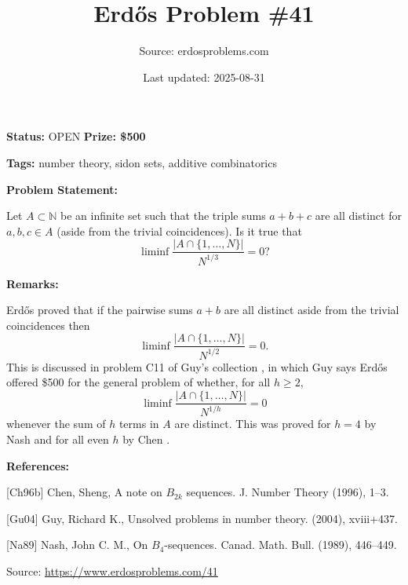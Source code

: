 \documentclass{article}
\title{Erd\H{o}s Problem \#41}
\date{Last updated: 2025-08-31}
\author{Source: erdosproblems.com}
\begin{document}
\maketitle

\noindent\textbf{Status:} OPEN \quad \textbf{Prize: \$500}

\noindent\textbf{Tags:} number theory, sidon sets, additive combinatorics

\medskip
\noindent\textbf{Problem Statement:}

Let $A\subset\mathbb{N}$ be an infinite set such that the triple sums $a+b+c$ are all distinct for $a,b,c\in A$ (aside from the trivial coincidences). Is it true that\[\liminf \frac{\lvert A\cap \{1,\ldots,N\}\rvert}{N^{1/3}}=0?\]

\bigskip
\noindent\textbf{Remarks:}

Erd\H{o}s proved that if the pairwise sums $a+b$ are all distinct aside from the trivial coincidences then\[\liminf \frac{\lvert A\cap \{1,\ldots,N\}\rvert}{N^{1/2}}=0.\]This is discussed in problem C11 of Guy's collection \cite{Gu04}, in which Guy says Erd\H{o}s offered \$500 for the general problem of whether, for all $h\geq 2$,\[\liminf \frac{\lvert A\cap \{1,\ldots,N\}\rvert}{N^{1/h}}=0\]whenever the sum of $h$ terms in $A$ are distinct. This was proved for $h=4$ by Nash \cite{Na89} and for all even $h$ by Chen \cite{Ch96b}.

\bigskip
\noindent\textbf{References:}

[Ch96b] Chen, Sheng, A note on {$B_{2k}$} sequences. J. Number Theory (1996), 1--3.
 
 [Gu04] Guy, Richard K., Unsolved problems in number theory. (2004), xviii+437.
 
 [Na89] Nash, John C. M., On {$B_4$}-sequences. Canad. Math. Bull. (1989), 446--449.

\bigskip
\noindent\small{Source: \url{https://www.erdosproblems.com/41}}
\end{document}

